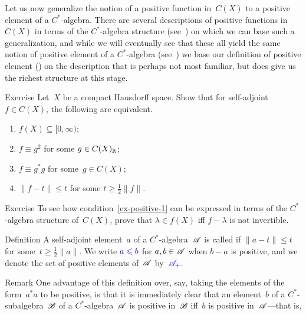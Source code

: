 \documentclass[a]{subfiles}
\begin{document}
\begin{parsec}%
\begin{point}%
Let us now generalize the notion of a positive function
in~$C(X)$
to a positive element of a $C^*$-algebra.
There are several descriptions of
positive functions in~$C(X)$ in terms of the $C^*$-algebra structure
(see~) on which we can base such a  generalization,
and while we will eventually see that these all yield the same notion
of positive element of a $C^*$-algebra (see~)
we base our definition of positive element ()
on the description that is perhaps
not most familiar,
but does give us the richest structure at this stage.
\end{point}
\begin{point}[cx-positive]{Exercise}%
Let~$X$ be a compact Hausdorff space.
Show that for self-adjoint $f\in C(X)$, the following are equivalent.
\begin{enumerate}
\item \label{cx-positive-1}
$f(X)\subseteq [0,\infty)$;
\item
$f\equiv g^2$ for some $g\in C(X)_{\mathbb{R}}$;
\item
$f\equiv g^* g$ for some~$g\in C(X)$;
\item
$\|f-t\|\leq t$ for some $t\geq \frac{1}{2}\|f\|$.
\end{enumerate}
\begin{point}{Exercise}%
To see how condition~\ref{cx-positive-1}
can be expressed in terms of the $C^*$-algebra structure of~$C(X)$,
prove that  $\lambda\in f(X)$ iff $f-\lambda$
is not invertible.
\end{point}
\end{point}
\begin{point}{Definition}%
A self-adjoint element~$a$ of a $C^*$-algebra~$\mathscr{A}$ is called
%
if $\|a-t\|\leq t$
for some~$t\geq \frac{1}{2}\|a\|$.
We write $\Define{a\leq b}$%
for $a,b\in\mathscr{A}$ when $b-a$ is positive,
and we denote the set of positive elements of~$\mathscr{A}$
by~$\Define{\pos{\scrA}}$.%
\begin{point}{Remark}%
One advantage of this
definition
over, say, taking the elements of the form~$a^*a$
to be positive,
is that it is immediately clear
that an element~$b$ of a $C^*$-subalgebra~$\mathscr{B}$
of a $C^*$-algebra~$\mathscr{A}$ is positive in~$\mathscr{B}$
iff~$b$ is positive in~$\mathscr{A}$---that is,

\end{point}
\end{point}
\end{parsec}
\end{document}
